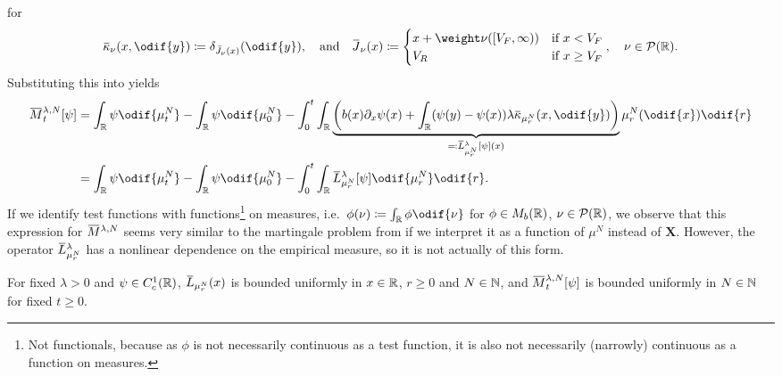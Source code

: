 for
\begin{equation}\label{eq:ol-kappa-ol-J-def}
  \ol{\kappa}_\nu(x, \odif{y}) \coloneqq \delta_{\bar{\jtarg}_\nu(x)}(\odif{y}),
  \quad\text{and}\quad
  \ol{\jtarg}_\nu(x) \coloneqq \begin{cases}
    x + \weight \nu([V_F,\infty)) & \text{if } x < V_F    \\
    V_R                           & \text{if } x \geq V_F
  \end{cases}, \quad \nu \in \cP(\potspace).
\end{equation}
Substituting this into  yields
\begin{equation}\label{eq:emp-M-expression}
  \begin{split}
    \ol{M}_t^{\lambda, N}[\psi]
     & = \int_\potspace \psi \odif{\mu_t^N} - \int_\potspace \psi \odif{\mu_0^N}
    - \int_0^t \int_\potspace \underbrace{\br*{ b(x) \partial_x \psi(x) + \int_\potspace (\psi(y) - \psi(x)) \lambda \ol{\kappa}_{\mu_{r}^N}(x, \odif{y}) }}_{\eqqcolon \ol{L}_{\mu_{r}^N}^{\lambda} [\psi](x)} \mu_{r}^N(\odif{x}) \odif{r} \\
     & = \int_\potspace \psi \odif{\mu_t^N} - \int_\potspace \psi \odif{\mu_0^N}
    - \int_0^t \int_\potspace \ol{L}_{\mu_{r}^N}^{\lambda} [\psi] \odif{\mu_{r}^N} \odif{r}.
  \end{split}
\end{equation}
If we identify test functions with functions\footnote{Not functionals, because as \( \phi \) is not necessarily continuous as a test function, it is also not necessarily (narrowly) continuous as a function on measures.} on measures, i.e.\ \( \phi(\nu) \coloneqq \int_\potspace \phi \odif{\nu} \) for \(\phi \in M_b(\mathbb{R})\), \( \nu \in \mathcal{P}(\mathbb{R}) \), we observe that this expression for \(\ol{M}^{\lambda,N}\) seems very similar to the martingale problem from  if we interpret it as a function of \(\mu^N\) instead of \(\bm{X}\).
However, the operator \(\ol{L}_{\mu_{r}^N}^{\lambda}\) has a nonlinear dependence on the empirical measure, so it is not actually of this form.

\begin{lemma}\label{lem:emp-mart-bounded}
  For fixed \( \lambda > 0 \) and \( \psi \in C_c^1(\mathbb{R}) \), \( \ol{L}_{\mu_{r}^N}(x) \) is bounded uniformly in \( x \in \mathbb{R} \), \( r \geq 0 \) and \( N \in \mathbb{N} \), and \( \ol{M}_t^{\lambda, N}[\psi] \) is bounded uniformly in \( N \in \mathbb{N} \) for fixed \( t \geq 0 \).
\end{lemma}

